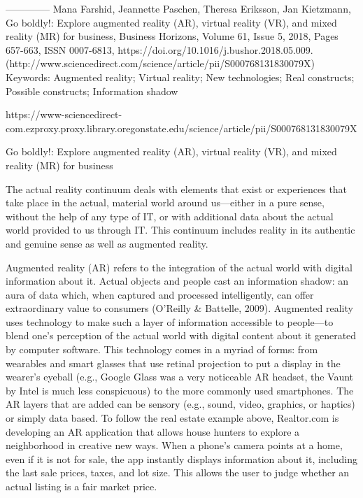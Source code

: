 --------------
Mana Farshid, Jeannette Paschen, Theresa Eriksson, Jan Kietzmann,
Go boldly!: Explore augmented reality (AR), virtual reality (VR), and mixed reality (MR) for business,
Business Horizons,
Volume 61, Issue 5,
2018,
Pages 657-663,
ISSN 0007-6813,
https://doi.org/10.1016/j.bushor.2018.05.009.
(http://www.sciencedirect.com/science/article/pii/S000768131830079X)
Keywords: Augmented reality; Virtual reality; New technologies; Real constructs; Possible constructs; Information shadow


https://www-sciencedirect-com.ezproxy.proxy.library.oregonstate.edu/science/article/pii/S000768131830079X

Go boldly!: Explore augmented reality (AR), virtual reality (VR), and mixed reality (MR) for business


The actual reality continuum deals with elements that exist or experiences that take place in the actual, material world around us—either in a pure sense, without the help of any type of IT, or with additional data about the actual world provided to us through IT. This continuum includes reality in its authentic and genuine sense as well as augmented reality.

Augmented reality (AR) refers to the integration of the actual world with digital information about it. Actual objects and people cast an information shadow: an aura of data which, when captured and processed intelligently, can offer extraordinary value to consumers (O’Reilly & Battelle, 2009). Augmented reality uses technology to make such a layer of information accessible to people—to blend one’s perception of the actual world with digital content about it generated by computer software. This technology comes in a myriad of forms: from wearables and smart glasses that use retinal projection to put a display in the wearer’s eyeball (e.g., Google Glass was a very noticeable AR headset, the Vaunt by Intel is much less conspicuous) to the more commonly used smartphones. The AR layers that are added can be sensory (e.g., sound, video, graphics, or haptics) or simply data based. To follow the real estate example above, Realtor.com is developing an AR application that allows house hunters to explore a neighborhood in creative new ways. When a phone’s camera points at a home, even if it is not for sale, the app instantly displays information about it, including the last sale prices, taxes, and lot size. This allows the user to judge whether an actual listing is a fair market price.



